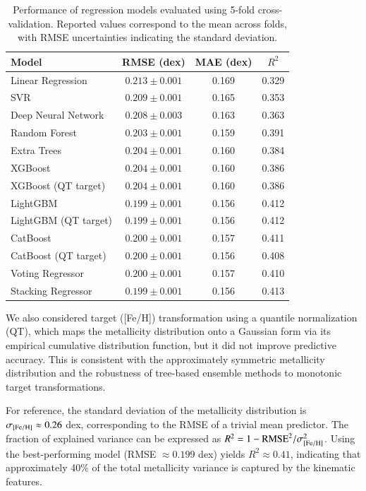 \documentclass{aa}
\begin{document}
\begin{appendix}
\begin{table}
\caption{Performance of regression models evaluated using 5-fold cross-validation.
Reported values correspond to the mean across folds, with RMSE uncertainties
indicating the standard deviation.}
\centering
\begin{tabular}{lccc}
\hline
Model & RMSE (dex) & MAE (dex) & $R^2$ \\
\hline
Linear Regression & $0.213 \pm 0.001$ & 0.169 & 0.329 \\
SVR & $0.209 \pm 0.001$ & 0.165 & 0.353 \\
Deep Neural Network & $0.208 \pm 0.003$ & 0.163 & 0.363 \\
Random Forest & $0.203 \pm 0.001$ & 0.159 & 0.391 \\
Extra Trees & $0.204 \pm 0.001$ & 0.160 & 0.384 \\
XGBoost & $0.204 \pm 0.001$ & 0.160 & 0.386 \\
XGBoost (QT target) & $0.204 \pm 0.001$ & 0.160 & 0.386 \\
LightGBM & $\mathbf{0.199 \pm 0.001}$ & 0.156 & 0.412 \\
LightGBM (QT target) & $0.199 \pm 0.001$ & 0.156 & 0.412 \\
CatBoost & $0.200 \pm 0.001$ & 0.157 & 0.411 \\
CatBoost (QT target) & $0.200 \pm 0.001$ & 0.156 & 0.408 \\
Voting Regressor & $0.200 \pm 0.001$ & 0.157 & 0.410 \\
Stacking Regressor & $0.199 \pm 0.001$ & 0.156 & 0.413 \\
\hline
\end{tabular}
\label{tab:cv_scores_full}
\end{table}


We also considered target ([Fe/H]) transformation using a quantile normalization (QT), which maps the metallicity distribution onto a Gaussian form via its empirical cumulative distribution function, but it did not improve predictive accuracy. This is consistent with the approximately symmetric metallicity distribution and the robustness of tree-based ensemble methods to monotonic target transformations.

For reference, the standard deviation of the metallicity distribution is $\sigma_{\rm [Fe/H]} \approx 0.26$ dex, corresponding to the RMSE of a trivial mean predictor. The fraction of explained variance can be expressed as $R^2 = 1 - \mathrm{RMSE}^2 / \sigma_{\rm [Fe/H]}^2$. Using the best-performing model (RMSE $\approx 0.199$ dex) yields $R^2 \approx 0.41$, indicating that approximately 40\% of the total metallicity variance is captured by the kinematic features.


\end{appendix}
\end{document}
